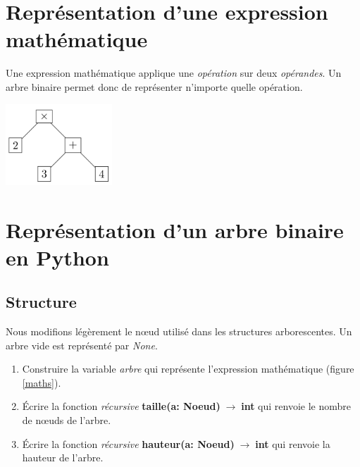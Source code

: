\documentclass[a4paper,11pt]{article}
\begin{document}
\begin{Form}
\section{Représentation d'une expression mathématique}
Une expression mathématique applique une \emph{opération} sur deux \emph{opérandes}. Un arbre binaire permet donc de représenter n'importe quelle opération.
\begin{center}
\centering
\includegraphics[width=4cm]{ressources/npi.png}
\label{maths}
\end{center}
\section{Représentation d'un arbre binaire en Python}
\subsection{Structure}
Nous modifions légèrement le nœud utilisé dans les structures arborescentes. Un arbre vide est représenté par \emph{None}.
\begin{center}

\label{noeud}
\end{center}
\begin{activite}
\begin{enumerate}
\item Construire la variable \emph{arbre} qui représente l'expression mathématique (figure \ref{maths}).
\item Écrire la fonction \emph{récursive} \textbf{taille(a: Noeud)$\;\rightarrow\;$int} qui renvoie le nombre de nœuds de l'arbre.
\item Écrire la fonction \emph{récursive} \textbf{hauteur(a: Noeud)$\;\rightarrow\;$int} qui renvoie la hauteur de l'arbre.
\end{enumerate}
\end{activite}

\end{Form}
\end{document}
